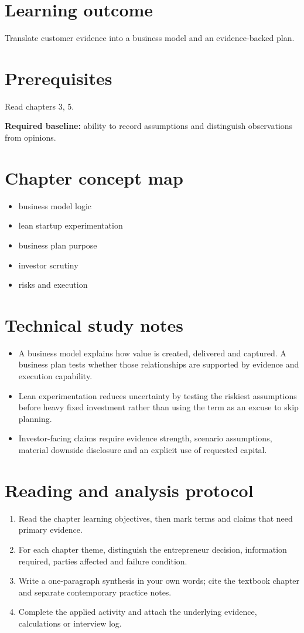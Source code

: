 \documentclass[11pt,letterpaper]{article}
\begin{document}
\SuiteOpen
\section{Learning outcome}
Translate customer evidence into a business model and an evidence-backed plan.
\section{Prerequisites}
Read chapters 3, 5.\par\textbf{Required baseline:} ability to record assumptions and distinguish observations from opinions.
\section{Chapter concept map}
\begin{itemize}[leftmargin=*,itemsep=3pt]
\item business model logic
\item lean startup experimentation
\item business plan purpose
\item investor scrutiny
\item risks and execution
\end{itemize}

\section{Technical study notes}
\begin{itemize}[leftmargin=*,itemsep=3pt]
\item A business model explains how value is created, delivered and captured. A business plan tests whether those relationships are supported by evidence and execution capability.
\item Lean experimentation reduces uncertainty by testing the riskiest assumptions before heavy fixed investment rather than using the term as an excuse to skip planning.
\item Investor-facing claims require evidence strength, scenario assumptions, material downside disclosure and an explicit use of requested capital.
\end{itemize}

\section{Reading and analysis protocol}
\begin{enumerate}[leftmargin=*,itemsep=5pt]
\item Read the chapter learning objectives, then mark terms and claims that need primary evidence.
\item For each chapter theme, distinguish the entrepreneur decision, information required, parties affected and failure condition.
\item Write a one-paragraph synthesis in your own words; cite the textbook chapter and separate contemporary practice notes.
\item Complete the applied activity and attach the underlying evidence, calculations or interview log.
\end{enumerate}
\end{document}
